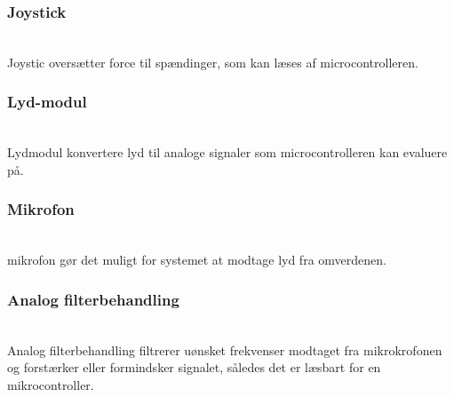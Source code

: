 \subsubsection*{\textbf{Joystick}}\hfill\\
Joystic oversætter force til spændinger, som kan læses af microcontrolleren.
\subsubsection*{\textbf{Lyd-modul}}\hfill\\
Lydmodul konvertere lyd til analoge signaler som microcontrolleren kan evaluere på.
\subsubsection*{\textbf{Mikrofon}}\hfill\\
mikrofon gør det muligt for systemet at modtage lyd fra omverdenen.
\subsubsection*{\textbf{Analog filterbehandling}}\hfill\\
Analog filterbehandling filtrerer uønsket frekvenser modtaget fra mikrokrofonen og forstærker eller formindsker signalet, således det er læsbart for en mikrocontroller.